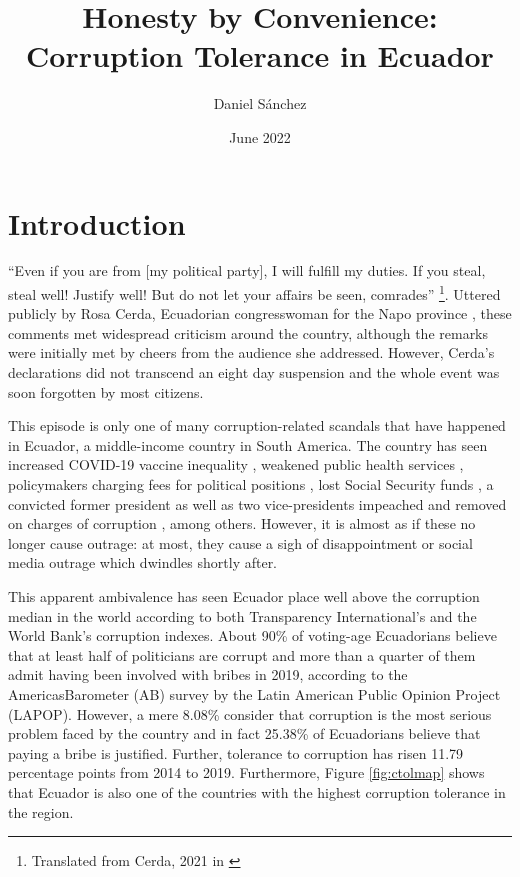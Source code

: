 \documentclass[12pt,a4]{article}
\title{Honesty by Convenience: Corruption Tolerance in Ecuador}
\author{Daniel Sánchez}
\date{June 2022}
\begin{document}

\section{Introduction}
\enquote{Even if you are from [my political party], I will fulfill my duties. If you steal, steal well!  Justify well! But do not let your affairs be seen, comrades} \footnote{Translated from Cerda, 2021 in \cite[para. 2]{PlanV.2021}}. Uttered publicly by Rosa Cerda, Ecuadorian congresswoman for the Napo province \parencite{Castro.2021}, these comments met widespread criticism around the country, although the remarks were initially met by cheers from the audience she addressed. However, Cerda's declarations did not transcend an eight day suspension \parencite{Ordonez.2021} and the whole event was soon forgotten by most citizens. 

This episode is only one of many corruption-related scandals that have happened in Ecuador, a middle-income country in South America. The country has seen increased COVID-19 vaccine inequality \parencite{Taj.2021}, weakened public health services \parencite{Celi.2020}, policymakers charging fees for political positions \parencite{Espinosa.2021}, lost Social Security funds \parencite{Pesantes.9152020}, a convicted former president as well as two vice-presidents impeached and removed on charges of corruption \parencite{Cabrera.2020}, among others. However, it is almost as if these no longer cause outrage: at most, they cause a sigh of disappointment or social media outrage which dwindles shortly after.

This apparent ambivalence has seen Ecuador place well above the corruption median in the world according to both Transparency International's and the World Bank's corruption indexes. About 90\% of voting-age Ecuadorians believe that at least half of politicians are corrupt and more than a quarter of them admit having been involved with bribes in 2019, according to the AmericasBarometer (AB) survey by the Latin American Public Opinion Project (LAPOP). However, a mere 8.08\% consider that corruption is the most serious problem faced by the country and in fact 25.38\% of Ecuadorians believe that paying a bribe is justified. Further, tolerance to corruption has risen 11.79 percentage points from 2014 to 2019. Furthermore, Figure \ref{fig:ctolmap} shows that Ecuador is also one of the countries with the highest corruption tolerance in the region.

\end{document}
